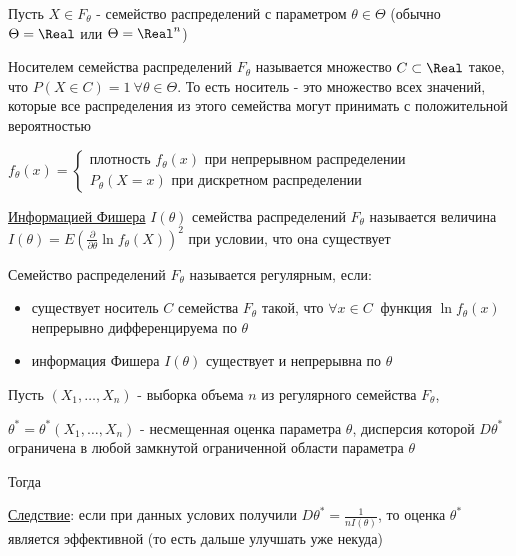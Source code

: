\begin{enumerate}
    Пусть $X \in F_\theta$ - семейство распределений с параметром $\theta \in \Theta$ (обычно $\Theta = \Real$ или $\Theta = \Real^n$)

    \Def Носителем семейства распределений $F_\theta$ называется множество $C \subset \Real$
    такое, что $P(X \in C) = 1 \ \forall \theta \in \Theta$. То есть носитель - это множество всех значений, которые все распределения из этого семейства могут принимать с положительной вероятностью

    $f_\theta(x) = \begin{cases}
        \text{плотность } f_\theta(x) \text{ при непрерывном распределении} \\
        P_\theta(X = x) \text{ при дискретном распределении}
    \end{cases}$

    \Def \hyperlink{fishers_information}{Информацией Фишера} $I(\theta)$ семейства распределений $F_\theta$ называется величина 
    $I(\theta) = E\left(\frac{\partial}{\partial \theta} \ln f_\theta(X)\right)^2$ при условии, что
    она существует

    \Def Семейство распределений $F_\theta$ называется регулярным, если:

    \begin{itemize}
        \item существует носитель $C$ семейства $F_\theta$ такой, что $\forall x \in C \ $ функция $\ln f_\theta(x)$ непрерывно дифференцируема по $\theta$
        \item информация Фишера $I(\theta)$ существует и непрерывна по $\theta$
    \end{itemize}

    \begin{MyTheorem}
         Пусть $(X_1, \dots, X_n)$ - выборка объема $n$ из регулярного семейства $F_\theta$,

        $\theta^* = \theta^*(X_1, \dots, X_n)$ - несмещенная оценка параметра $\theta$, дисперсия которой
        $D\theta^*$ ограничена в любой замкнутой ограниченной области параметра $\theta$

        Тогда 
    \end{MyTheorem}

    \underline{Следствие}: если при данных услових получили $D\theta^* = \frac{1}{n I(\theta)}$, то оценка $\theta^*$ является эффективной 
    (то есть дальше улучшать уже некуда)


\end{enumerate}
